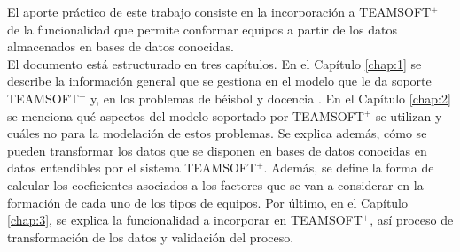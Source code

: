 El aporte práctico de este trabajo consiste en la incorporación a TEAMSOFT$^+$ de la funcionalidad que permite conformar equipos a partir de los datos almacenados en bases de datos conocidas.\\

El documento está estructurado en tres capítulos. En el Capítulo \ref{chap:1} se describe la información general que se gestiona en el modelo que le da soporte TEAMSOFT$^+$ y, en los problemas de béisbol y docencia . En el Capítulo \ref{chap:2} se menciona qué aspectos del modelo soportado por TEAMSOFT$^+$ se utilizan y cuáles no para la modelación de estos problemas. Se explica además, cómo se pueden transformar los datos que se disponen en bases de datos conocidas \citep{DISERTIC2020, INDER2020} en datos entendibles por el sistema TEAMSOFT$^+$. Además, se define la forma de calcular los coeficientes asociados a los factores que se van a considerar en la formación de cada uno de los tipos de equipos. Por último, en el Capítulo \ref{chap:3}, se explica la funcionalidad a incorporar en TEAMSOFT$^+$, así proceso de transformación de los datos y validación del proceso.

